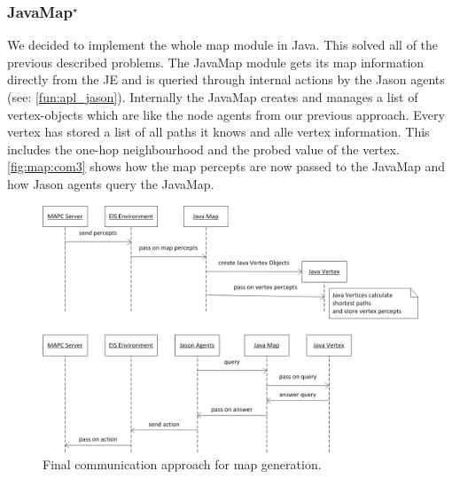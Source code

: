 \subsubsection[JavaMap]{JavaMap$^\star$}\label{alg:map_javamap}
We decided to implement the whole map module in Java. This solved all of the previous described problems. The JavaMap module gets its map information directly from the JE and is queried through internal actions by the Jason agents (see: \autoref{fun:apl_jason}). Internally the JavaMap creates and manages a list of vertex-objects which are like the node agents from our previous approach. Every vertex has stored a list of all paths it knows and alle vertex information. This includes the one-hop neighbourhood and the probed value of the vertex. \autoref{fig:map:com3} shows how the map percepts are now passed to the JavaMap and how Jason agents query the JavaMap.
\begin{figure}
  \centering
  \includegraphics[width=\linewidth]{images/map_com_3.png}
  \caption{Final communication approach for map generation.}
  \label{fig:map:com3}
\end{figure}

